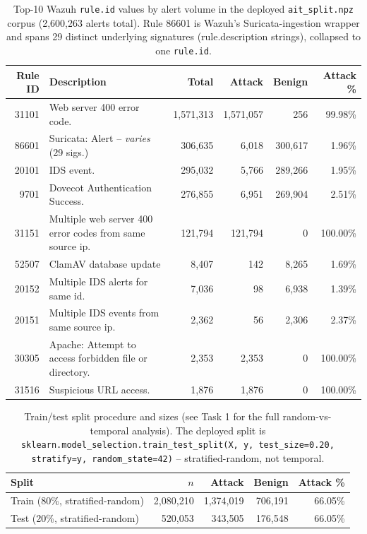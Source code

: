 \begin{table}[t]
\centering
\caption{Top-10 Wazuh \texttt{rule.id} values by alert volume in the deployed
\texttt{ait\_split.npz} corpus (2{,}600{,}263 alerts total). Rule 86601 is
Wazuh's Suricata-ingestion wrapper and spans 29 distinct underlying
signatures (rule.description strings), collapsed to one \texttt{rule.id}.}
\label{tab:top10-rules}
\begin{tabular}{rlrrrr}
\toprule
Rule ID & Description & Total & Attack & Benign & Attack \% \\
\midrule
31101 & Web server 400 error code. & 1{,}571{,}313 & 1{,}571{,}057 & 256 & 99.98\% \\
86601 & Suricata: Alert -- \emph{varies} (29 sigs.) & 306{,}635 & 6{,}018 & 300{,}617 & 1.96\% \\
20101 & IDS event. & 295{,}032 & 5{,}766 & 289{,}266 & 1.95\% \\
9701 & Dovecot Authentication Success. & 276{,}855 & 6{,}951 & 269{,}904 & 2.51\% \\
31151 & Multiple web server 400 error codes from same source ip. & 121{,}794 & 121{,}794 & 0 & 100.00\% \\
52507 & ClamAV database update & 8{,}407 & 142 & 8{,}265 & 1.69\% \\
20152 & Multiple IDS alerts for same id. & 7{,}036 & 98 & 6{,}938 & 1.39\% \\
20151 & Multiple IDS events from same source ip. & 2{,}362 & 56 & 2{,}306 & 2.37\% \\
30305 & Apache: Attempt to access forbidden file or directory. & 2{,}353 & 2{,}353 & 0 & 100.00\% \\
31516 & Suspicious URL access. & 1{,}876 & 1{,}876 & 0 & 100.00\% \\
\bottomrule
\end{tabular}
\end{table}

\begin{table}[t]
\centering
\caption{Train/test split procedure and sizes (see Task 1 for the full
random-vs-temporal analysis). The deployed split is
\texttt{sklearn.model\_selection.train\_test\_split(X, y, test\_size=0.20,
stratify=y, random\_state=42)} -- stratified-random, not temporal.}
\label{tab:split-sizes}
\begin{tabular}{lrrrr}
\toprule
Split & $n$ & Attack & Benign & Attack \% \\
\midrule
Train (80\%, stratified-random) & 2{,}080{,}210 & 1{,}374{,}019 & 706{,}191 & 66.05\% \\
Test (20\%, stratified-random) & 520{,}053 & 343{,}505 & 176{,}548 & 66.05\% \\
\bottomrule
\end{tabular}
\end{table}
